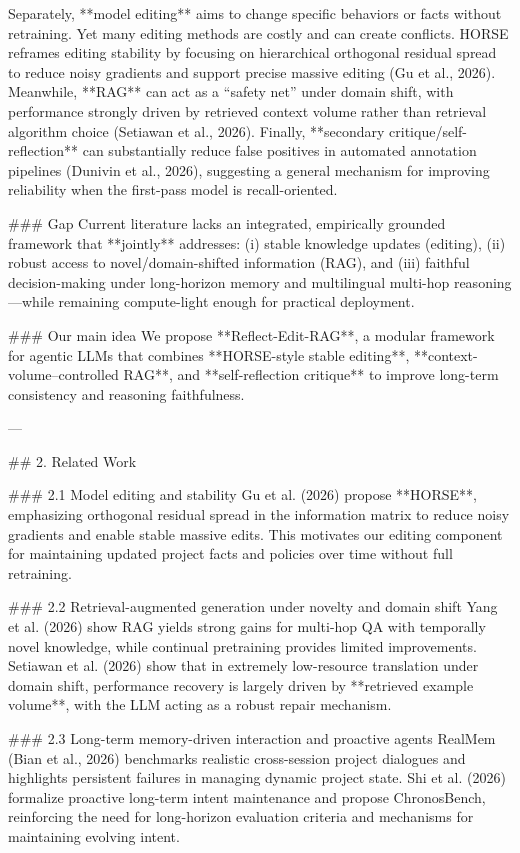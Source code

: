 Separately, **model editing** aims to change specific behaviors or facts without retraining. Yet many editing methods are costly and can create conflicts. HORSE reframes editing stability by focusing on hierarchical orthogonal residual spread to reduce noisy gradients and support precise massive editing (Gu et al., 2026). Meanwhile, **RAG** can act as a “safety net” under domain shift, with performance strongly driven by retrieved context volume rather than retrieval algorithm choice (Setiawan et al., 2026). Finally, **secondary critique/self-reflection** can substantially reduce false positives in automated annotation pipelines (Dunivin et al., 2026), suggesting a general mechanism for improving reliability when the first-pass model is recall-oriented.

### Gap  
Current literature lacks an integrated, empirically grounded framework that **jointly** addresses: (i) stable knowledge updates (editing), (ii) robust access to novel/domain-shifted information (RAG), and (iii) faithful decision-making under long-horizon memory and multilingual multi-hop reasoning—while remaining compute-light enough for practical deployment.

### Our main idea  
We propose **Reflect-Edit-RAG**, a modular framework for agentic LLMs that combines **HORSE-style stable editing**, **context-volume–controlled RAG**, and **self-reflection critique** to improve long-term consistency and reasoning faithfulness.

---

## 2. Related Work  

### 2.1 Model editing and stability  
Gu et al. (2026) propose **HORSE**, emphasizing orthogonal residual spread in the information matrix to reduce noisy gradients and enable stable massive edits. This motivates our editing component for maintaining updated project facts and policies over time without full retraining.

### 2.2 Retrieval-augmented generation under novelty and domain shift  
Yang et al. (2026) show RAG yields strong gains for multi-hop QA with temporally novel knowledge, while continual pretraining provides limited improvements. Setiawan et al. (2026) show that in extremely low-resource translation under domain shift, performance recovery is largely driven by **retrieved example volume**, with the LLM acting as a robust repair mechanism.

### 2.3 Long-term memory-driven interaction and proactive agents  
RealMem (Bian et al., 2026) benchmarks realistic cross-session project dialogues and highlights persistent failures in managing dynamic project state. Shi et al. (2026) formalize proactive long-term intent maintenance and propose ChronosBench, reinforcing the need for long-horizon evaluation criteria and mechanisms for maintaining evolving intent.

